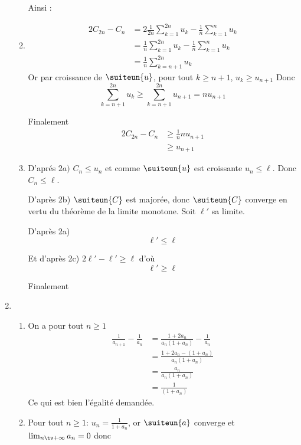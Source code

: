 \documentclass[a4paper, 11pt,reqno]{article}
\begin{document}
\begin{correction}
\begin{enumerate}
\begin{enumerate}
Ainsi :


\item \begin{align*}
2 C_{2n}-C_n &= 2 \frac{1}{2n }\sum_{k=1}^{2n} u_k - \frac{1}{n }\sum_{k=1}^{n} u_k\\
					&= \frac{1}{n }\sum_{k=1}^{2n} u_k - \frac{1}{n }\sum_{k=1}^{n} u_k\\
				&= \frac{1}{n }\sum_{k=n+1}^{2n} u_k 
\end{align*}
Or par croissance de $\suiteun{u}$, pour tout $k\geq n+1$, $u_k\geq u_{n+1}$ Donc  
$$\sum_{k=n+1}^{2n} u_k  \geq \sum_{k=n+1}^{2n} u_{n+1} = nu_{n+1}$$

Finalement 
\begin{eqnarray*}
2 C_{2n}-C_n &\geq \frac{1}{n }nu_{n+1}\\ 
					&\geq u_{n+1}
\end{eqnarray*}



\item D'aprés $2a)$ $C_n \leq u_n$ et comme $\suiteun{u} $ est croissante $u_n\leq \ell$. Donc $C_n\leq \ell$. 

D'après 2b) $\suiteun{C} $ est majorée, donc $\suiteun{C}$ converge en vertu du théorème de la limite monotone.  Soit $\ell'$ sa limite. 

D'après 2a) $$\ell' \leq \ell$$

Et d'après 2c) $2 \ell' - \ell' \geq \ell $ d'où $$\ell' \geq \ell$$ 

Finalement




\end{enumerate}
\item \begin{enumerate}
\item On a pour tout $n\geq 1$
\begin{eqnarray*}
\frac{1}{a_{n+1}} -\frac{1}{a_n} &= \frac{1+2a_n}{a_n(1+a_n)} -\frac{1}{a_n}\\
&= \frac{1+2a_n - (1+a_n)}{a_n(1+a_n)} \\
&= \frac{a_n}{a_n(1+a_n)} \\
&= \frac{1}{(1+a_n)} 
\end{eqnarray*}
Ce qui est bien l'égalité demandée. 
\item Pour tout $n\geq 1$:  $u_n =\frac{1}{1+a_n}$, or $\suiteun{a}$ converge et $\lim_{n\tv+\infty} a_n =0$ donc 


\end{enumerate}
\end{enumerate}
\end{correction}
\end{document}

